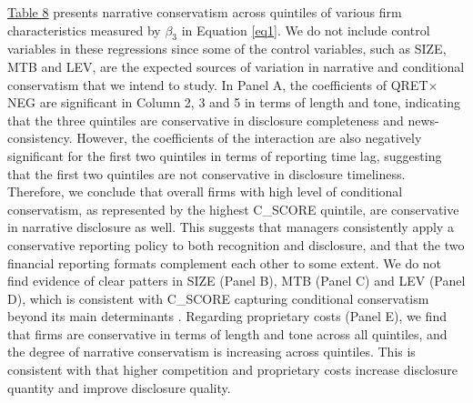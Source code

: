 \documentclass[letterpaper,12pt]{article}
\begin{document}
\begin{spacing}{1.5}
\hyperref[T8]{Table 8} presents narrative conservatism across quintiles of various firm characteristics measured by $\beta_3$ in Equation \eqref{eq1}. We do not include control variables in these regressions since some of the control variables, such as SIZE, MTB and LEV, are the expected sources of variation in narrative and conditional conservatism that we intend to study. In Panel A, the coefficients of QRET$\times$NEG are significant in Column 2, 3 and 5 in terms of length and tone, indicating that the three quintiles are conservative in disclosure completeness and news-consistency. However, the coefficients of the interaction are also negatively significant for the first two quintiles in terms of reporting time lag, suggesting that the first two quintiles are not conservative in disclosure timeliness. Therefore, we conclude that overall firms with high level of conditional conservatism, as represented by the highest C\_SCORE quintile, are conservative in narrative disclosure as well. This suggests that managers consistently apply a conservative reporting policy to both recognition and disclosure, and that the two financial reporting formats complement each other to some extent. We do not find evidence of clear patters in SIZE (Panel B), MTB (Panel C) and LEV (Panel D), which is consistent with C\_SCORE capturing conditional conservatism beyond its main determinants \cite{khanEstimationEmpiricalProperties2009}. Regarding proprietary costs (Panel E), we find that firms are conservative in terms of length and tone across all quintiles, and the degree of narrative conservatism is increasing across quintiles. This is consistent with  that higher competition and proprietary costs increase disclosure quantity and improve disclosure quality.  



\end{spacing}
\end{document}
